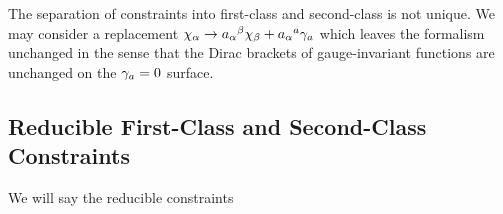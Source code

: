 The separation of constraints into first-class and second-class is not
unique. We may consider a replacement
$\chi_{\alpha}\to{a_{\alpha}}^{\beta}\chi_{\beta}+{a_{\alpha}}^{a}\gamma_{a}$
which leaves the formalism unchanged in the sense that the Dirac
brackets of gauge-invariant functions are unchanged on the
$\gamma_{a}=0$ surface.

\subsection{Reducible First-Class and Second-Class Constraints}

\M
We will say the reducible constraints
